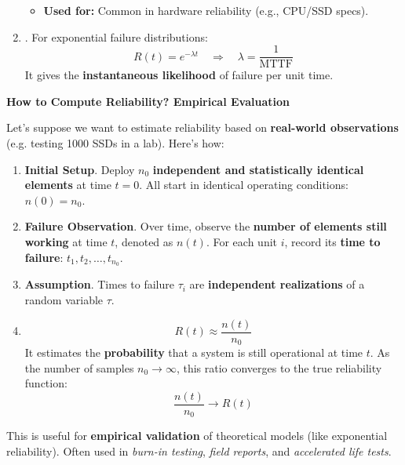 \begin{enumerate}
\begin{itemize}
\begin{equation}
        \end{equation}
        \item[\textcolor{Green3}{\faIcon{tools}}] \textcolor{Green3}{\textbf{Used for:}} Common in hardware reliability (e.g., CPU/SSD specs).
    \end{itemize}
    \item {}. For exponential failure distributions:
    \begin{equation}\label{eq: failure rate}
        R(t) = e^{-\lambda t} \quad \Rightarrow \quad \lambda = \frac{1}{\text{MTTF}}
    \end{equation}
    It gives the \textbf{instantaneous likelihood} of failure per unit time.
\end{enumerate}

\newpage

\begin{flushleft}
    \textcolor{Green3}{ \textbf{How to Compute Reliability? Empirical Evaluation}}
\end{flushleft}
Let's suppose we want to estimate reliability based on \textbf{real-world observations} (e.g. testing 1000 SSDs in a lab). Here's how:
\begin{enumerate}
    \item \textbf{Initial Setup}. Deploy $n_0$ \textbf{independent and statistically identical elements} at time $t = 0$. All start in identical operating conditions: $n\left(0\right) = n_0$.

    \item \textbf{Failure Observation}. Over time, observe the \textbf{number of elements still working} at time $t$, denoted as $n\left(t\right)$. For each unit $i$, record its \textbf{time to failure}: $t_1, t_2, \dots, t_{n_0}$.

    \item \textbf{Assumption}. Times to failure $\tau_i$ are \textbf{independent realizations} of a random variable $\tau$.

    \item {}
    \begin{equation}
        R(t) \approx \dfrac{n(t)}{n_0}
    \end{equation}
    It estimates the \textbf{probability} that a system is still operational at time $t$. As the number of samples $n_0 \rightarrow \infty$, this ratio converges to the true reliability function:
    \begin{equation}
        \dfrac{n(t)}{n_0} \longrightarrow R(t)
    \end{equation}
\end{enumerate}
This is useful for \textbf{empirical validation} of theoretical models (like exponential reliability). Often used in \emph{burn-in testing}, \emph{field reports}, and \emph{accelerated life tests}.

